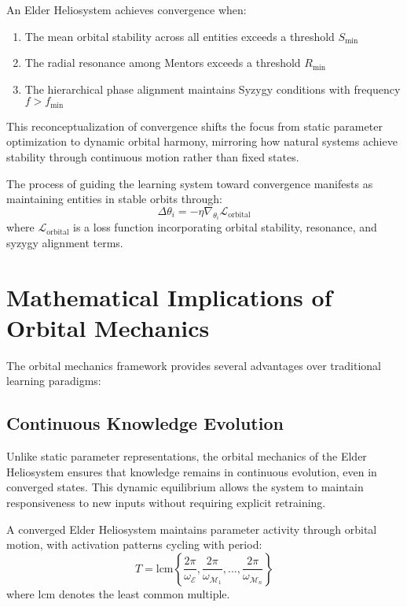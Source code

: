 \begin{theorem}
An Elder Heliosystem achieves convergence when:
\begin{enumerate}
    \item The mean orbital stability across all entities exceeds a threshold $S_{\text{min}}$
    \item The radial resonance among Mentors exceeds a threshold $R_{\text{min}}$
    \item The hierarchical phase alignment maintains Syzygy conditions with frequency $f > f_{\text{min}}$
\end{enumerate}
\end{theorem}

This reconceptualization of convergence shifts the focus from static parameter optimization to dynamic orbital harmony, mirroring how natural systems achieve stability through continuous motion rather than fixed states.

\begin{proposition}
The process of guiding the learning system toward convergence manifests as maintaining entities in stable orbits through:
\begin{equation}
\Delta\theta_i = -\eta \nabla_{\theta_i} \mathcal{L}_{\text{orbital}}
\end{equation}
where $\mathcal{L}_{\text{orbital}}$ is a loss function incorporating orbital stability, resonance, and syzygy alignment terms.
\end{proposition}

\section{Mathematical Implications of Orbital Mechanics}

The orbital mechanics framework provides several advantages over traditional learning paradigms:

\subsection{Continuous Knowledge Evolution}

Unlike static parameter representations, the orbital mechanics of the Elder Heliosystem ensures that knowledge remains in continuous evolution, even in converged states. This dynamic equilibrium allows the system to maintain responsiveness to new inputs without requiring explicit retraining.

\begin{theorem}
A converged Elder Heliosystem maintains parameter activity through orbital motion, with activation patterns cycling with period:
\begin{equation}
T = \text{lcm}\left\{\frac{2\pi}{\omega_{\mathcal{E}}}, \frac{2\pi}{\omega_{\mathcal{M}_1}}, \ldots, \frac{2\pi}{\omega_{\mathcal{M}_n}}\right\}
\end{equation}
where $\text{lcm}$ denotes the least common multiple.
\end{theorem}

